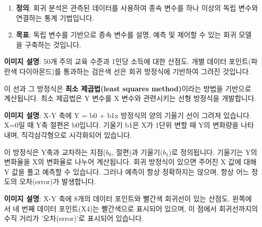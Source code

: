 \documentclass[11pt,a4paper]{book}
\theoremstyle{definition}
\begin{document}
\begin{tcolorbox}[infobox, title={회귀 방정식 (Regression Equation)}]
\begin{enumerate}[label=\arabic*.]
    \item \textbf{정의}: 회귀 분석은 관측된 데이터를 사용하여 종속 변수를 하나 이상의 독립 변수와 연결하는 통계 기법입니다.
    \item \textbf{목표}: 독립 변수를 기반으로 종속 변수를 설명, 예측 및 제어할 수 있는 회귀 모델을 구축하는 것입니다.
\end{enumerate}

\begin{center}
\end{center}
\textbf{이미지 설명}: 50개 주의 교육 수준과 1인당 소득에 대한 산점도. 개별 데이터 포인트(파란색 다이아몬드)를 통과하는 검은색 선은 회귀 방정식에 기반하여 그려진 것입니다.

이 선과 그 방정식은 \textbf{최소 제곱법(least squares method)}이라는 방법을 기반으로 계산됩니다. 최소 제곱법은 Y 변수를 X 변수와 관련시키는 선형 방정식을 개발합니다.

\begin{center}
\end{center}
\textbf{이미지 설명}: X-Y 축에 Y = b0 + b1x 방정식의 양의 기울기 선이 그려져 있습니다. X=0일 때 Y축 절편은 b0입니다. 기울기 b1은 X가 1단위 변할 때 Y의 변화량을 나타내며, 직각삼각형으로 시각화되어 있습니다.

이 방정식은 Y축과 교차하는 지점($b_0$, 절편)과 기울기($b_1$)로 정의됩니다. 기울기는 Y의 변화율을 X의 변화율로 나누어 계산됩니다. 회귀 방정식이 있으면 주어진 X 값에 대해 Y 값을 풀고 예측할 수 있습니다. 그러나 예측이 항상 정확하지는 않으며, 항상 어느 정도의 오차(error)가 발생합니다.

\begin{center}
\end{center}
\textbf{이미지 설명}: X-Y 축에 8개의 데이터 포인트와 빨간색 회귀선이 있는 산점도. 왼쪽에서 네 번째 데이터 포인트(X4)는 빨간색으로 표시되어 있으며, 이 점에서 회귀선까지의 수직 거리가 '오차(error)'로 표시되어 있습니다.


\end{tcolorbox}
\end{document}
